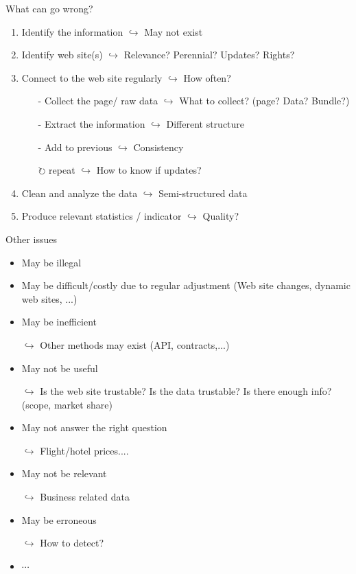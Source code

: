 \documentclass[xcolor=x11names, aspectratio=169, compress]{beamer}
\renewcommand{\(}{\begin{columns}}
\renewcommand{\)}{\end{columns}}
\newcommand{\<}[1]{\begin{column}{#1}}
\renewcommand{\>}{\end{column}}
\begin{document}
\begin{frame}{What can go wrong?}
\pause
\begin{enumerate}[<+->]
    \item Identify the information $\hookrightarrow$ May not exist
    \item Identify web site(s) $\hookrightarrow$ Relevance? Perennial? Updates? Rights?
    \item Connect to the web site regularly $\hookrightarrow$ How often?
    \begin{itemize}[<+->]
        \item[-] Collect the page/ raw data $\hookrightarrow$ What to collect? (page? Data? Bundle?)
        \item[-] Extract the information $\hookrightarrow$ Different structure
        \item[-] Add to previous $\hookrightarrow$ Consistency
        \item[$\circlearrowright$] repeat $\hookrightarrow$ How to know if updates?
    \end{itemize}
    \item Clean and analyze the data $\hookrightarrow$ Semi-structured data
    \item Produce relevant statistics / indicator $\hookrightarrow$ Quality?
\end{enumerate}
\end{frame}


\begin{frame}{Other issues}
\pause
\begin{itemize}[<+->]
    \item May be illegal
    \item May be difficult/costly due to regular adjustment  (Web site changes, dynamic web sites, ...)
    \item May be inefficient
    \item[$\hookrightarrow$ ] Other methods may  exist (API, contracts,...)
    \item May not be useful
    \item[$\hookrightarrow$ ] Is the web site trustable? Is the data trustable?  Is there enough info? (scope, market share)
    \item May not answer the right question
    \item[$\hookrightarrow$ ] Flight/hotel prices....
     \item May not be relevant
    \item[$\hookrightarrow$ ] Business related data
    \item May be erroneous
    \item[$\hookrightarrow$ ]How to detect?
    \item $\cdots$
\end{itemize}
\end{frame}
\end{document}
